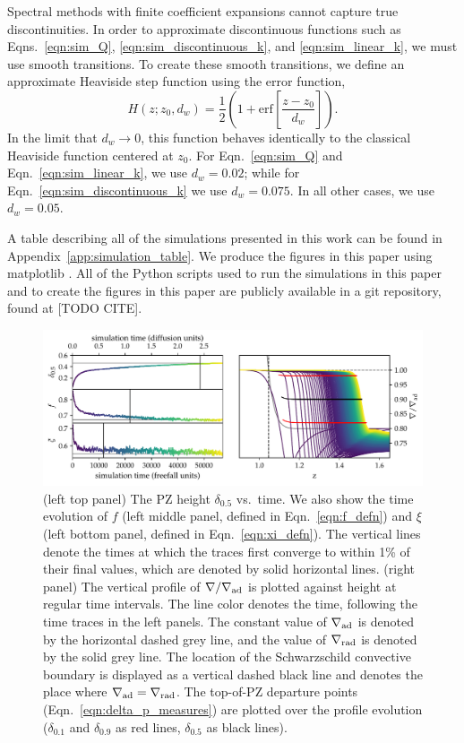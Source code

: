 \documentclass[twocolumn]{aastex631}
\newcommand{\gradrad}{\ensuremath{\nabla_{\rm{rad}}}}
\newcommand{\gradad}{\ensuremath{\nabla_{\rm{ad}}}}
\newcommand{\justgrad}{\ensuremath{\nabla}}
\begin{document}
Spectral methods with finite coefficient expansions cannot capture true discontinuities.
In order to approximate discontinuous functions such as Eqns.~\ref{eqn:sim_Q}, \ref{eqn:sim_discontinuous_k}, and \ref{eqn:sim_linear_k}, we must use smooth transitions.
To create these smooth transitions, we define an approximate Heaviside step function using the error function,
\begin{equation}
H(z; z_0, d_w) = \frac{1}{2}\left(1 + \mathrm{erf}\left[\frac{z - z_0}{d_w}\right]\right).
\label{eqn:heaviside}
\end{equation}
In the limit that $d_w \rightarrow 0$, this function behaves identically to the classical Heaviside function centered at $z_0$.
For Eqn.~\ref{eqn:sim_Q} and Eqn.~\ref{eqn:sim_linear_k}, we use $d_w = 0.02$; while for Eqn.~\ref{eqn:sim_discontinuous_k} we use $d_w = 0.075$.
In all other cases, we use $d_w = 0.05$.

A table describing all of the simulations presented in this work can be found in Appendix~\ref{app:simulation_table}.
We produce the figures in this paper using matplotlib \citep{hunter2007, mpl3.3.4}.
All of the Python scripts used to run the simulations in this paper and to create the figures in this paper are publicly available in a git repository, found at [TODO CITE].

\begin{figure}[t]
\centering
\includegraphics[width=\textwidth]{time_evolution.pdf}
\caption{
(left top panel) The PZ height $\delta_{0.5}$ vs.~time.
We also show the time evolution of $f$ (left middle panel, defined in Eqn.~\ref{eqn:f_defn}) and $\xi$ (left bottom panel, defined in Eqn.~\ref{eqn:xi_defn}).
The vertical lines denote the times at which the traces first converge to within 1\% of their final values, which are denoted by solid horizontal lines.
(right panel) The vertical profile of $\justgrad/\gradad$ is plotted against height at regular time intervals.
The line color denotes the time, following the time traces in the left panels.
The constant value of $\gradad$ is denoted by the horizontal dashed grey line, and the value of $\gradrad$ is denoted by the solid grey line.
The location of the Schwarzschild convective boundary is displayed as a vertical dashed black line and denotes the place where $\gradad = \gradrad$.
The top-of-PZ departure points (Eqn.~\ref{eqn:delta_p_measures}) are plotted over the profile evolution ($\delta_{0.1}$ and $\delta_{0.9}$ as red lines, $\delta_{0.5}$ as black lines).
\label{fig:time_evolution}
}
\end{figure}
\end{document}
